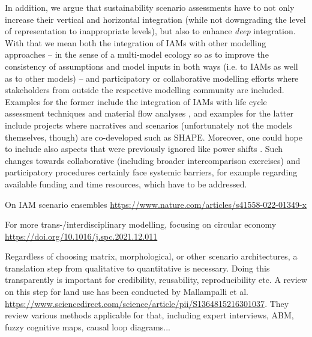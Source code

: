 \documentclass{article}
\begin{document}
\begin{refsection}
In addition, we argue that sustainability scenario assessments have to not only increase their vertical and horizontal integration (while not downgrading the level of representation to inappropriate levels), but also to enhance \textit{deep} integration. With that we mean both the integration of IAMs with other modelling approaches -- in the sense of a multi-model ecology \parencite{bollinger_2015} so as to improve the consistency of assumptions and model inputs in both ways (i.e. to IAMs as well as to other models) -- and participatory or collaborative modelling efforts where stakeholders from outside the respective modelling community are included. Examples for the former include the integration of IAMs with life cycle assessment techniques \parencite[e.g.][]{luderer_2019} and material flow analyses \parencite[for an overview see:][]{baars_2022,kullmann_2021}, and examples for the latter include projects where narratives and scenarios (unfortunately not the models themselves, though) are co-developed such as SHAPE. Moreover, one could hope to include also aspects that were previously ignored like power shifts \parencite{rutting_2022}. Such changes towards collaborative (including broader intercomparison exercises) and participatory procedures certainly face systemic barriers, for example regarding available funding and time resources, which have to be addressed.

On IAM scenario ensembles \url{https://www.nature.com/articles/s41558-022-01349-x}

For more trans-/interdisciplinary modelling, focusing on circular economy \url{https://doi.org/10.1016/j.spc.2021.12.011}

Regardless of choosing matrix, morphological, or other scenario architectures, a translation step from qualitative to quantitative is necessary. Doing this transparently is important for credibility, reusability, reproducibility etc. A review on this step for land use has been conducted by Mallampalli et al. \url{https://www.sciencedirect.com/science/article/pii/S1364815216301037}. They review various methods applicable for that, including expert interviews, ABM, fuzzy cognitive maps, causal loop diagrams...


\end{refsection}
\end{document}
